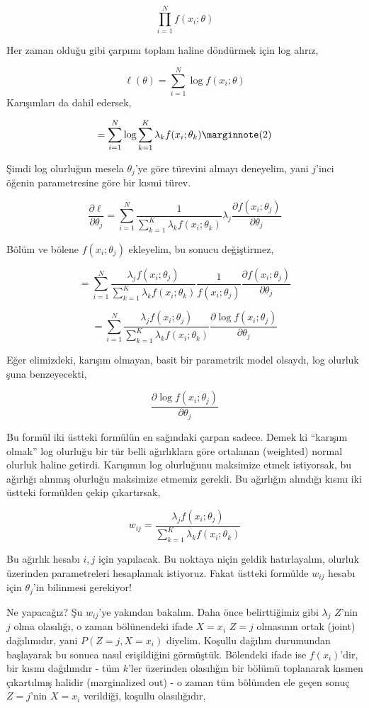 \documentclass[12pt,fleqn]{article}\usepackage{../../common}
\begin{document}
$$ \prod _{i=1}^{N} f(x_i;\theta) $$

Her zaman olduğu gibi çarpımı toplam haline döndürmek için log alırız, 

$$ \ell(\theta) = \sum _{i=1}^{N} \log f(x_i;\theta) $$
Karışımları da dahil edersek,

$$ = \sum _{i=1}^{N} \log \sum _{k=1}^{K} \lambda_k f(x_i;\theta_k) 
\mlabel{2}
$$

Şimdi log olurluğun mesela $\theta_j$'ye göre türevini almayı deneyelim,
yani $j$'inci öğenin parametresine göre bir kısmi türev. 

$$ \frac{\partial \ell}{\partial \theta_j}  = 
\sum _{i=1}^{N}  \frac{1}{\sum _{k=1}^{K} \lambda_k f(x_i;\theta_k) } 
\lambda_j
\frac{\partial f(x_i;\theta_j)}{\partial \theta_j}
$$

Bölüm ve bölene $f(x_i;\theta_j)$ ekleyelim, bu sonucu değiştirmez, 

$$ = \sum _{i=1}^{N}  
\frac{\lambda_j f(x_i;\theta_j)}{\sum _{k=1}^{K} \lambda_k f(x_i;\theta_k)}
\frac{1}{f(x_i;\theta_j)}
\frac{\partial f(x_i;\theta_j)}{\partial \theta_j}
$$

$$ = \sum _{i=1}^{N}  
\frac{\lambda_j f(x_i;\theta_j)}{\sum _{k=1}^{K} \lambda_k f(x_i;\theta_k)}
\frac{\partial \log f(x_i;\theta_j)}{\partial \theta_j}
$$

Eğer elimizdeki, karışım olmayan, basit bir parametrik model olsaydı, log
olurluk şuna benzeyecekti, 

$$ \frac{\partial \log f(x_i;\theta_j)}{\partial \theta_j} $$

Bu formül iki üstteki formülün en sağındaki çarpan sadece. Demek ki
``karışım olmak'' log olurluğu bir tür belli ağırlıklara göre ortalanan
(weighted) normal olurluk haline getirdi. Karışımın log olurluğunu
maksimize etmek istiyorsak, bu ağırlığı alınmış olurluğu maksimize etmemiz
gerekli. Bu ağırlığın alındığı kısmı iki üstteki formülden çekip
çıkartırsak, 

$$ w_{ij} = \frac{\lambda_j f(x_i;\theta_j)}{\sum _{k=1}^{K} \lambda_k f(x_i;\theta_k)} $$

Bu ağırlık hesabı $i,j$ için yapılacak. Bu noktaya niçin geldik
hatırlayalım, olurluk üzerinden parametreleri hesaplamak istiyoruz. Fakat
üstteki formülde $w_{ij}$ hesabı için $\theta_j$'in bilinmesi gerekiyor!

Ne yapacağız? Şu $w_{ij}$'ye yakından bakalım. Daha önce belirttiğimiz gibi
$\lambda_j$ $Z$'nin $j$ olma olasılığı, o zaman bölünendeki ifade $X = x_i$
$Z=j$ olmasının ortak (joint) dağılımıdır, yani $P(Z=j,X=x_i)$
diyelim. Koşullu dağılım durumundan başlayarak bu sonuca nasıl
erişildiğini görmüştük. Bölendeki ifade ise $f(x_i)$'dir, bir kısmı
dağılımdır - tüm $k$'ler üzerinden olasılığın bir bölümü toplanarak kısmen
çıkartılmış halidir (marginalized out) - o zaman tüm bölümden ele geçen
sonuç $Z=j$'nin $X=x_i$ verildiği, koşullu olasılığıdır,
\end{document}
